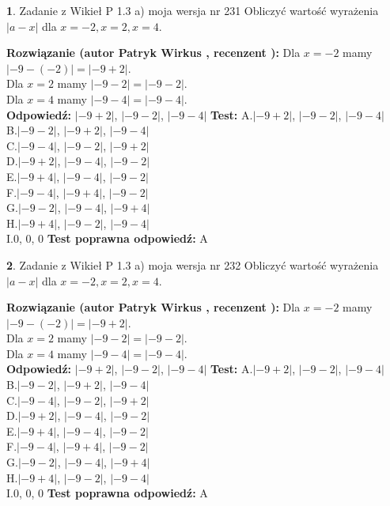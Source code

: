 \documentclass[12pt, a4paper]{article}
\theoremstyle{definition} %
\newtheorem{zad}{}
\newcommand{\zadStart}[1]{\begin{zad}#1\newline}
\newcommand{\zadStop}{\end{zad}}
\newcommand{\rozwStart}[2]{\noindent \textbf{Rozwiązanie (autor #1 , recenzent #2): }\newline}
\newcommand{\rozwStop}{\newline}
\newcommand{\odpStart}{\noindent \textbf{Odpowiedź:}\newline}
\newcommand{\odpStop}{\newline}
\newcommand{\testStart}{\noindent \textbf{Test:}\newline}
\newcommand{\testStop}{\newline}
\newcommand{\kluczStart}{\noindent \textbf{Test poprawna odpowiedź:}\newline}
\newcommand{\kluczStop}{\newline}
\begin{document}
\zadStart{Zadanie z Wikieł P 1.3 a) moja wersja nr 231}
Obliczyć wartość wyrażenia $|a - x|$ dla $x=-2,x=2,x=4$.
\zadStop
\rozwStart{Patryk Wirkus}{}
Dla $x = -2$ mamy $|-9 - (-2)| = |-9 + 2|$.\\
Dla $x = 2$ mamy $|-9 - 2| = |-9 - 2|$.\\
Dla $x = 4$ mamy $|-9 - 4| = |-9 - 4|$.\\
\rozwStop
\odpStart
$|-9 + 2|$, $|-9 - 2|$, $|-9 - 4|$
\odpStop
\testStart
A.$|-9 + 2|$, $|-9 - 2|$, $|-9 - 4|$\\
B.$|-9 - 2|$, $|-9 + 2|$, $|-9 - 4|$\\
C.$|-9 - 4|$, $|-9 - 2|$, $|-9 + 2|$\\
D.$|-9 + 2|$, $|-9 - 4|$, $|-9 - 2|$\\
E.$|-9 + 4|$, $|-9 - 4|$, $|-9 - 2|$\\
F.$|-9 - 4|$, $|-9 + 4|$, $|-9 - 2|$\\
G.$|-9 - 2|$, $|-9 - 4|$, $|-9 + 4|$\\
H.$|-9 + 4|$, $|-9 - 2|$, $|-9 - 4|$\\
I.$0$, $0$, $0$
\testStop
\kluczStart
A
\kluczStop



\zadStart{Zadanie z Wikieł P 1.3 a) moja wersja nr 232}
Obliczyć wartość wyrażenia $|a - x|$ dla $x=-2,x=2,x=4$.
\zadStop
\rozwStart{Patryk Wirkus}{}
Dla $x = -2$ mamy $|-9 - (-2)| = |-9 + 2|$.\\
Dla $x = 2$ mamy $|-9 - 2| = |-9 - 2|$.\\
Dla $x = 4$ mamy $|-9 - 4| = |-9 - 4|$.\\
\rozwStop
\odpStart
$|-9 + 2|$, $|-9 - 2|$, $|-9 - 4|$
\odpStop
\testStart
A.$|-9 + 2|$, $|-9 - 2|$, $|-9 - 4|$\\
B.$|-9 - 2|$, $|-9 + 2|$, $|-9 - 4|$\\
C.$|-9 - 4|$, $|-9 - 2|$, $|-9 + 2|$\\
D.$|-9 + 2|$, $|-9 - 4|$, $|-9 - 2|$\\
E.$|-9 + 4|$, $|-9 - 4|$, $|-9 - 2|$\\
F.$|-9 - 4|$, $|-9 + 4|$, $|-9 - 2|$\\
G.$|-9 - 2|$, $|-9 - 4|$, $|-9 + 4|$\\
H.$|-9 + 4|$, $|-9 - 2|$, $|-9 - 4|$\\
I.$0$, $0$, $0$
\testStop
\kluczStart
A
\kluczStop
\end{document}
